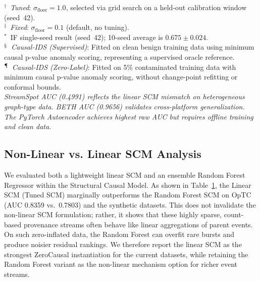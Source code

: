 \begin{table}[t]
\begin{tabularx}{\textwidth}{Xccccc}
\bottomrule
\end{tabularx}
\begin{minipage}{\textwidth}
\footnotesize\raggedright
$^\dagger$~\textit{Tuned}: $\sigma_{\text{floor}}=1.0$, selected via grid search on a held-out calibration window (seed~42).\\
$^\ddagger$~\textit{Fixed}: $\sigma_{\text{floor}}=0.1$ (default, no tuning).\\
$^*$~IF single-seed result (seed~42); 10-seed average is $0.675 \pm 0.024$.\\
$^\mathsection$~\textit{Causal-IDS (Supervised)}: Fitted on clean benign training data using minimum causal p-value anomaly scoring, representing a supervised oracle reference.\\
$^\mathparagraph$~\textit{Causal-IDS (Zero-Label)}: Fitted on 5\% contaminated training data with minimum causal p-value anomaly scoring, without change-point refitting or conformal bounds.\\[2pt]
\textit{StreamSpot AUC (0.4991) reflects the linear SCM mismatch on heterogeneous graph-type data. BETH AUC (0.9656) validates cross-platform generalization. The PyTorch Autoencoder achieves highest raw AUC but requires offline training and clean data.}
\end{minipage}
\label{tab:performance}
\end{table}

\subsection{Non-Linear vs. Linear SCM Analysis}
We evaluated both a lightweight linear SCM and an ensemble Random Forest Regressor within the Structural Causal Model. As shown in Table~\ref{tab:performance}, the Linear SCM (Tuned SCM) marginally outperforms the Random Forest SCM on OpTC (AUC 0.8359 vs.\ 0.7803) and the synthetic datasets. This does not invalidate the non-linear SCM formulation; rather, it shows that these highly sparse, count-based provenance streams often behave like linear aggregations of parent events. On such zero-inflated data, the Random Forest can overfit rare bursts and produce noisier residual rankings. We therefore report the linear SCM as the strongest ZeroCausal instantiation for the current datasets, while retaining the Random Forest variant as the non-linear mechanism option for richer event streams.

